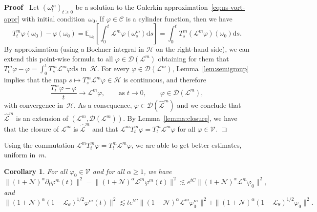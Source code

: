 \documentclass[10pt]{article}
\newcommand{\mathd}{\mathrm{d}}
\newenvironment{proof}{\noindent\textbf{Proof\ }}{\hspace*{\fill}$\Box$\medskip}
\newtheorem{corollary}{Corollary}
\begin{document}
\begin{proof}
  Let $(\omega^m_t)_{t \geqslant 0}$ be a solution to the Galerkin
  approximation~{\eqref{eq:ns-vort-appr}} with initial condition~$\omega_0$.
  If $\varphi \in \mathcal{C}$ is a cylinder function, then we have
  \[ T^m_t \varphi (\omega_0) - \varphi (\omega_0) =\mathbb{E}_{\omega_0}
     \left[ \int_0^t \mathcal{L}^m \varphi (\omega^m_s) \mathd s \right] =
     \int_0^t T^m_s (\mathcal{L}^m \varphi) (\omega_0) \mathd s. \]
  By approximation (using a Bochner integral in $\mathcal{H}$ on the
  right-hand side), we can extend this point-wise formula to all $\varphi \in
  \mathcal{D} (\mathcal{L}^m)$ obtaining for them that $T^m_t \varphi -
  \varphi = \int_0^t T^m_s \mathcal{L}^m \varphi \mathd s$ in~$\mathcal{H}$.
  For every $\varphi \in \mathcal{D} (\mathcal{L}^m)$,
  Lemma~\ref{lem:semigroup} implies that the map $s \mapsto T^m_s
  \mathcal{L}^m \varphi \in \mathcal{H}$ is continuous, and therefore
  \[ \frac{T_t^m \varphi - \varphi}{t} \rightarrow \mathcal{L}^m \varphi,
     \qquad \text{as } t \rightarrow 0, \qquad \varphi \in \mathcal{D}
     (\mathcal{L}^m), \]
  with convergence in~$\mathcal{H}$. As a consequence, $\varphi \in
  \mathcal{D} (\hat{\mathcal{L}}^m)$ and we conclude that
  $\hat{\mathcal{L}}^m$ is an extension of $(\mathcal{L}^m, \mathcal{D}
  (\mathcal{L}^m))$. By Lemma~\ref{lemma:closure}, we have that the closure of
  $\mathcal{L}^m$ is $\hat{\mathcal{L}}^m$ and that $\mathcal{L}^m T^m_t
  \varphi = T^m_t \mathcal{L}^m \varphi$ for all $\varphi \in \mathcal{V}$.
\end{proof}

Using the commutation $\mathcal{L}^m T^m_t \varphi = T^m_t \mathcal{L}^m
\varphi$, we are able to get better estimates, uniform in~$m$.

\begin{corollary}
  \label{cor:est-phi}For all $\varphi_0 \in \mathcal{V}$ and for all $\alpha
  \geqslant 1$, we have
  \begin{equation}
    \| (1 +\mathcal{N})^{\alpha} \partial_t \varphi^m (t) \|^2 = \| (1
    +\mathcal{N})^{\alpha} \mathcal{L}^m \varphi^m (t) \|^2 \lesssim e^{t C}
    \| (1 +\mathcal{N})^{\alpha} \mathcal{L}^m \varphi_0 \|^2,
    \label{eq:ctrl-dtphi}
  \end{equation}
  and
  \begin{equation}
    \| (1 +\mathcal{N})^{\alpha} (1 -\mathcal{L}_{\theta})^{1 / 2} \varphi^m
    (t) \|^2 \lesssim t e^{t C} \| (1 +\mathcal{N})^{\alpha} \mathcal{L}^m
    \varphi^m_0 \|^2 + \| (1 +\mathcal{N})^{\alpha} (1
    -\mathcal{L}_{\theta})^{1 / 2} \varphi_0 \|^2 . \label{eq:ctrl-phi}
  \end{equation}
\end{corollary}
\end{document}

